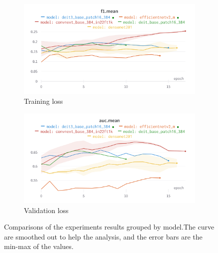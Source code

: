 \documentclass[11pt]{article}
\begin{document}
                \begin{figure}[H]
                     \centering
                     \begin{subfigure}[b]{0.45\textwidth}
                         \centering
                         \includegraphics[width=\textwidth]{plots/model_comparison_f1}
                         \caption{Training loss}
                         \vspace{4ex}
                         \label{fig:model_comparison_f1}
                     \end{subfigure}
                     \hfill
                     \begin{subfigure}[b]{0.45\textwidth}
                         \centering
                         \includegraphics[width=\textwidth]{plots/model_comparison_auc}
                         \caption{Validation loss}
                         \vspace{4ex}
                         \label{fig:model_comparison_auc}
                     \end{subfigure}

                     \caption{Comparisons of the experiments results grouped by model.The curve are smoothed out to help the analysis, and the error bars are the min-max
                         of the values.}
                \end{figure}
\end{document}
